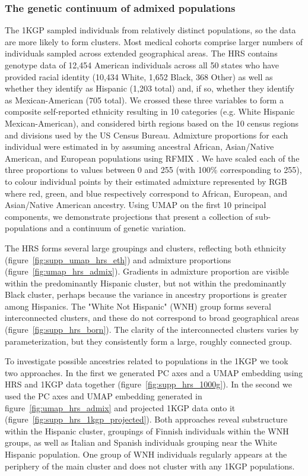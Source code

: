 \documentclass[12pt]{pnas-new}
\begin{document}
\subsubsection*{The genetic continuum of admixed populations} The 1KGP sampled individuals from relatively distinct populations, so the data are more likely to form clusters. Most medical cohorts comprise larger numbers of individuals sampled across extended geographical areas. The HRS contains genotype data of 12,454 American individuals across all 50 states who have provided racial identity (10,434 White, 1,652 Black, 368 Other) as well as whether they identify as Hispanic (1,203 total) and, if so, whether they identify as Mexican-American (705 total)\cite{juster1995overview}. We crossed these three variables to form a composite self-reported ethnicity resulting in 10 categories (e.g. White Hispanic Mexican-American), and considered birth regions based on the 10 census regions and divisions used by the US Census Bureau. Admixture proportions for each individual were estimated in \cite{baharian2016great} by assuming ancestral African, Asian/Native American, and European populations using RFMIX \cite{Maples:2013fia}. We have scaled each of the three proportions to values between 0 and 255 (with 100\% corresponding to 255), to colour individual points by their estimated admixture represented by RGB where red, green, and blue respectively correspond to African, European, and Asian/Native American ancestry. Using UMAP on the first 10 principal components, we demonstrate projections that present a collection of sub-populations and a continuum of genetic variation.

The HRS forms several large groupings and clusters, reflecting both ethnicity (figure~\ref{fig:supp_umap_hrs_eth}) and admixture proportions (figure~\ref{fig:umap_hrs_admix}). Gradients in admixture proportion are visible within the predominantly Hispanic cluster, but not within the predominantly Black cluster, perhaps because the variance in ancestry proportions is greater among Hispanics. The "White Not Hispanic" (WNH) group forms several interconnected clusters, and these do not correspond to broad geographical areas (figure~\ref{fig:supp_hrs_born}). The clarity of the interconnected clusters varies by parameterization, but they consistently form a large, roughly connected group.

To investigate possible ancestries related to populations in the 1KGP we took two approaches. In the first we generated PC axes and a UMAP embedding using HRS and 1KGP data together (figure~\ref{fig:supp_hrs_1000g}). In the second we used the PC axes and UMAP embedding generated in figure~\ref{fig:umap_hrs_admix} and projected 1KGP data onto it (figure~\ref{fig:supp_hrs_1kgp_projected}). Both approaches reveal substructure within the Hispanic cluster, groupings of Finnish individuals within the WNH groups, as well as Italian and Spanish individuals grouping near the White Hispanic population. One group of WNH individuals regularly appears at the periphery of the main cluster and does not cluster with any 1KGP populations.
\end{document}
